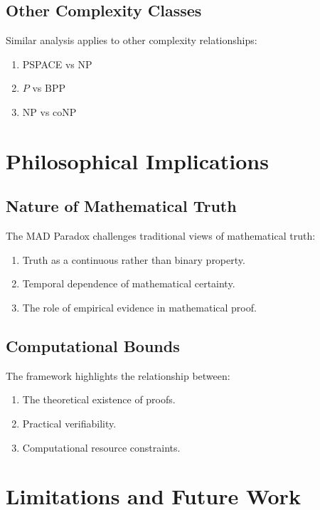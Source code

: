 \documentclass[11pt]{article}
\begin{document}
\subsection{Other Complexity Classes}

Similar analysis applies to other complexity relationships:
\begin{enumerate}[label=(\arabic*)]
    \item PSPACE vs NP
    \item $P$ vs BPP
    \item NP vs coNP
\end{enumerate}

\section{Philosophical Implications}

\subsection{Nature of Mathematical Truth}

The MAD Paradox challenges traditional views of mathematical truth:
\begin{enumerate}[label=(\arabic*)]
    \item Truth as a continuous rather than binary property.
    \item Temporal dependence of mathematical certainty.
    \item The role of empirical evidence in mathematical proof.
\end{enumerate}

\subsection{Computational Bounds}

The framework highlights the relationship between:
\begin{enumerate}[label=(\arabic*)]
    \item The theoretical existence of proofs.
    \item Practical verifiability.
    \item Computational resource constraints.
\end{enumerate}

\section{Limitations and Future Work}
\end{document}
